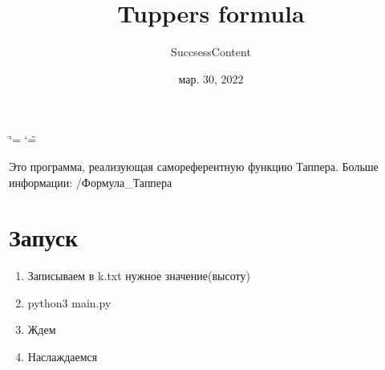 \documentclass[a4paper,10pt,russian]{sphinxmanual}
\title{Tupper\textquotesingle{}s formula}
\date{мар. 30, 2022}
\author{SuccsessContent}
\begin{document}
\ifdefined\shorthandoff
  \ifnum\catcode`\=\string=\active\shorthandoff{=}\fi
  \ifnum\catcode`\"=\active{}\fi
\fi

\pagestyle{empty}
\sphinxmaketitle
\pagestyle{plain}
\sphinxtableofcontents
\pagestyle{normal}
\label{\detokenize{index::doc}}


\sphinxAtStartPar
Это программа, реализующая самореферентную функцию Таппера.
Больше информации: /Формула\_Таппера


\chapter{Запуск}
\label{\detokenize{index:id2}}\begin{enumerate}
%
\item {} 
\sphinxAtStartPar
Записываем в k.txt нужное значение(высоту)

\item {} 
\sphinxAtStartPar
python3 main.py

\item {} 
\sphinxAtStartPar
Ждем

\item {} 
\sphinxAtStartPar
Наслаждаемся

\end{enumerate}
\end{document}
